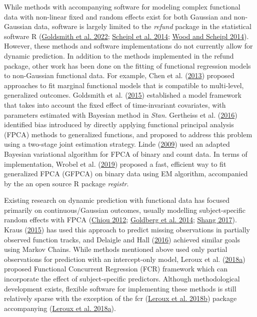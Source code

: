 \documentclass[
  11pt,
]{article}
\begin{document}
While methods with accompanying software for modeling complex functional
data with non-linear fixed and random effects exist for both Gaussian
and non-Gaussian data, software is largely limited to the \emph{refund}
package in the statistical software R
(\protect\hyperlink{ref-refundpkg}{Goldsmith et al. 2022};
\protect\hyperlink{ref-Scheipl2014}{Scheipl et al. 2014};
\protect\hyperlink{ref-wood2014}{Wood and Scheipl 2014}). However, these
methods and software implementations do not currently allow for dynamic
prediction. In addition to the methods implemented in the refund
package, other work has been done on the fitting of functional
regression models to non-Gaussian functional data. For example, Chen et
al. (\protect\hyperlink{ref-chen2013}{2013}) proposed approaches to fit
marginal functional models that is compatible to multi-level,
generalized outcomes. Goldsmith et al.
(\protect\hyperlink{ref-goldsmith2015}{2015}) established a model
framework that takes into account the fixed effect of time-invariant
covariates, with parameters estimated with Bayesian method in
\emph{Stan}. Gertheiss et al.
(\protect\hyperlink{ref-gertheiss2016}{2016}) identified bias introduced
by directly applying functional principal analysis (FPCA) methods to
generalized functions, and proposed to address this problem using a
two-stage joint estimation strategy. Linde
(\protect\hyperlink{ref-linde2019}{2009}) used an adapted Bayesian
variational algorithm for FPCA of binary and count data. In terms of
implementation, Wrobel et al. (\protect\hyperlink{ref-wrobel2019}{2019})
proposed a fast, efficient way to fit generalized FPCA (GFPCA) on binary
data using EM algorithm, accompanied by the an open source R package
\emph{registr}.

Existing research on dynamic prediction with functional data has focused
primarily on continuous/Gaussian outcomes, usually modelling
subject-specific random effects with FPCA
(\protect\hyperlink{ref-chiou2012}{Chiou 2012};
\protect\hyperlink{ref-goldberg2014}{Goldberg et al. 2014};
\protect\hyperlink{ref-shang2017}{Shang 2017}). Kraus
(\protect\hyperlink{ref-kraus2015}{2015}) has used this approach to
predict missing observations in partially observed function tracks, and
Delaigle and Hall (\protect\hyperlink{ref-delaigo2016}{2016}) achieved
similar goals using Markov Chains. While methods mentioned above used
only partial observations for prediction with an intercept-only model,
Leroux et al. (\protect\hyperlink{ref-leroux2016}{2018a}) proposed
Functional Concurrent Regression (FCR) framework which can incorporate
the effect of subject-specific predictors. Although methodological
development exists, flexible software for implementing these methods is
still relatively sparse with the exception of the fcr
(\protect\hyperlink{ref-fcrpkg}{Leroux et al. 2018b}) package
accompanying (\protect\hyperlink{ref-leroux2016}{Leroux et al. 2018a}).
\end{document}
